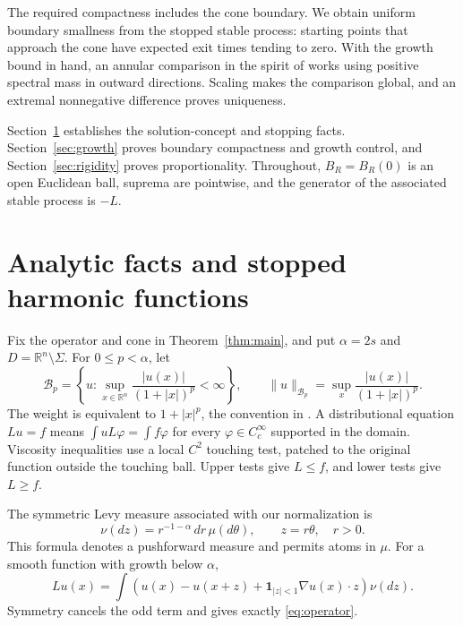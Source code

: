 \documentclass[11pt]{article}
\numberwithin{equation}{section}
\newcommand{\R}{\mathbb R}
\newcommand{\Bcal}{\mathcal B}
\begin{document}
The required compactness includes the cone boundary. We obtain uniform
boundary smallness from the stopped stable process: starting points that
approach the cone have expected exit times tending to zero. With the growth
bound in hand, an annular comparison in the spirit of \cite{RW} works using
positive spectral mass in outward directions. Scaling makes the comparison
global, and an extremal nonnegative difference proves uniqueness.

Section~\ref{sec:analytic} establishes the solution-concept and stopping
facts. Section~\ref{sec:growth} proves boundary compactness and growth
control, and Section~\ref{sec:rigidity} proves proportionality.
Throughout, \(B_R=B_R(0)\) is an open Euclidean ball, suprema are pointwise,
and the generator of the associated stable process is \(-L\).

\section{Analytic facts and stopped harmonic functions}\label{sec:analytic}

Fix the operator and cone in Theorem~\ref{thm:main}, and put
\(\alpha=2s\) and \(D=\R^n\setminus\Sigma\).
For \(0\le p<\alpha\), let
\[
 \Bcal_p=\left\{u:\sup_{x\in\R^n}
          \frac{|u(x)|}{(1+|x|)^p}<\infty\right\},
 \qquad \|u\|_{\Bcal_p}=
          \sup_x\frac{|u(x)|}{(1+|x|)^p}.
\]
The weight is equivalent to \(1+|x|^p\), the convention in
\cite{FR}. A distributional equation \(Lu=f\) means
\(\int uL\varphi=\int f\varphi\) for every
\(\varphi\in C_c^\infty\) supported in the domain. Viscosity inequalities
use a local \(C^2\) touching test, patched to the original function outside
the touching ball. Upper tests give \(L\le f\), and lower tests give
\(L\ge f\).

The symmetric Levy measure associated with our normalization is
\begin{equation}\label{eq:levy-measure}
 \nu(dz)=r^{-1-\alpha}\,dr\,\mu(d\theta),\qquad z=r\theta,\quad r>0.
\end{equation}
This formula denotes a pushforward measure and permits atoms in \(\mu\).
For a smooth function with growth below \(\alpha\),
\begin{equation}\label{eq:compensated}
 Lu(x)=\int\left(u(x)-u(x+z)
       +\mathbf1_{|z|<1}\nabla u(x)\cdot z\right)\nu(dz).
\end{equation}
Symmetry cancels the odd term and gives exactly \eqref{eq:operator}.
\end{document}
